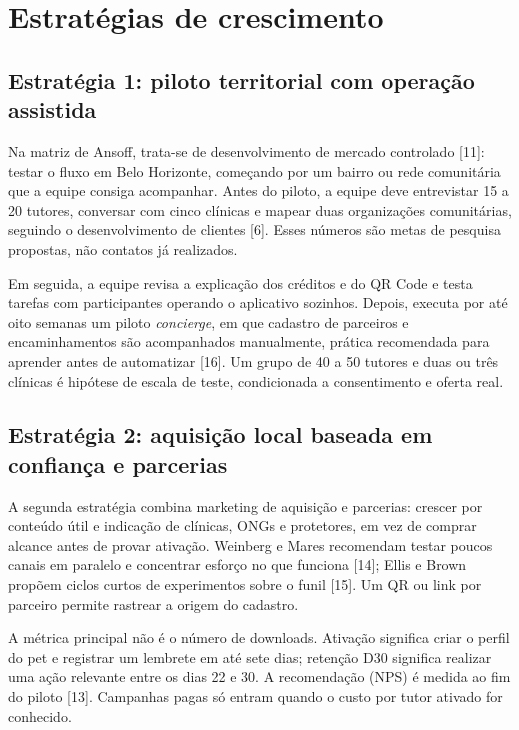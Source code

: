 \section{Estratégias de crescimento}

\subsection{Estratégia 1: piloto territorial com operação assistida}

Na matriz de Ansoff, trata-se de desenvolvimento de mercado controlado [11]: testar o fluxo em Belo Horizonte, começando por um bairro ou rede comunitária que a equipe consiga acompanhar. Antes do piloto, a equipe deve entrevistar 15 a 20 tutores, conversar com cinco clínicas e mapear duas organizações comunitárias, seguindo o desenvolvimento de clientes [6]. Esses números são metas de pesquisa propostas, não contatos já realizados.

Em seguida, a equipe revisa a explicação dos créditos e do QR Code e testa tarefas com participantes operando o aplicativo sozinhos. Depois, executa por até oito semanas um piloto \textit{concierge}, em que cadastro de parceiros e encaminhamentos são acompanhados manualmente, prática recomendada para aprender antes de automatizar [16]. Um grupo de 40 a 50 tutores e duas ou três clínicas é hipótese de escala de teste, condicionada a consentimento e oferta real.

\subsection{Estratégia 2: aquisição local baseada em confiança e parcerias}

A segunda estratégia combina marketing de aquisição e parcerias: crescer por conteúdo útil e indicação de clínicas, ONGs e protetores, em vez de comprar alcance antes de provar ativação. Weinberg e Mares recomendam testar poucos canais em paralelo e concentrar esforço no que funciona [14]; Ellis e Brown propõem ciclos curtos de experimentos sobre o funil [15]. Um QR ou link por parceiro permite rastrear a origem do cadastro.

A métrica principal não é o número de downloads. Ativação significa criar o perfil do pet e registrar um lembrete em até sete dias; retenção D30 significa realizar uma ação relevante entre os dias 22 e 30. A recomendação (NPS) é medida ao fim do piloto [13]. Campanhas pagas só entram quando o custo por tutor ativado for conhecido.

